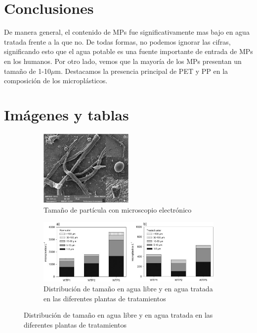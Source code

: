 \documentclass[a4paper,11pt]{article}
\begin{document}
\section{Conclusiones}
	De manera general, el contenido de MPs fue significativamente mas bajo en agua tratada frente a la que no. De todas formas, no podemos ignorar las cifras, significando esto que el agua potable es una fuente importante de entrada de MPs en los humanos.
	Por otro lado, vemos que la mayoría de los MPs presentan un tamaño de 1-10$\mu$m. Destacamos la presencia principal de PET y PP en la composición de los microplásticos.
\section{Imágenes y tablas}
	\begin{figure}[H]
		\centering
		\begin{subfigure}{0.45\textwidth}
			\includegraphics[width=0.5\textwidth]{electronico.jpg}
			\caption{Tamaño de partícula con microscopio electrónico}
			\label{electronico}
		\end{subfigure}
		\begin{subfigure}{0.45\textwidth}
		\includegraphics[width=1.2\textwidth]{size.jpg}
		\caption{Distribución de tamaño en agua libre y en agua tratada en las diferentes plantas de tratamientos}
		\label{size}
		\end{subfigure}
		
	\end{figure}
	
\end{document}
